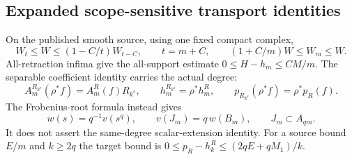 \subsection*{Expanded scope-sensitive transport identities}
On the published smooth source, using one fixed compact complex,
\[
 W_t\le W\le(1-C/t)W_{t-C},\qquad t=m+C,
 \qquad (1+C/m)W\le W_m\le W.
\]
All-retraction infima give the all-support estimate
$0\le H-h_m\le CM/m$.
The separable coefficient identity carries the actual degree:
\[
 A_m^{R_{k^s}}(\rho^*f)=A_m^R(f)R_{k^s},\qquad
 h_m^{R_{k^s}}=\rho^*h_m^R,\qquad
 p_{R_{k^s}}(\rho^*f)=\rho^*p_R(f).
\]
The Frobenius-root formula instead gives
\[
 w(s)=q^{-1}v(s^q),\qquad v(J_m)=q\,w(B_m),\qquad
 J_m\subset A_{qm}.
\]
It does not assert the same-degree scalar-extension identity.
For a source bound $E/m$ and $k\ge2q$ the target bound is
$0\le p_R-h_k^R\le(2qE+qM_1)/k$.
